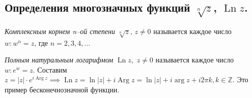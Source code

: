 \subsection*{Определения многозначных функций $\sqrt[n]{z}$, $\operatorname{Ln} z$.}

\begin{definition*}
	\textit{Комплексным корнем n--ой степени } $\sqrt[n] z, \,z \neq 0$  называется каждое число $w: w^n = z$, где $ n = 2, 3, 4, \dots$
\end{definition*}


\begin{definition*}
	\textit{Полным натуральным логарифмом } $\operatorname{Ln} z$, $ \,z \neq 0$  называется каждое число $w: e^w = z$.
	Составим $z = |z| \cdot e^{i\operatorname{Arg} z} \implies \operatorname{Ln} z  = \ln |z| + i \operatorname{Arg} z = \ln |z| + i \operatorname{arg} z + i 2\pi k, k \in \mathbb{Z}$. Это пример бесконечнозначной функции.
\end{definition*}